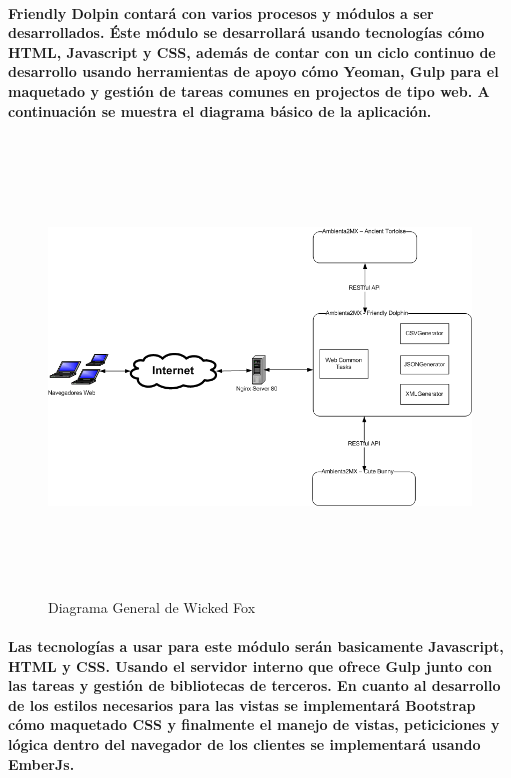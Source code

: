 	\paragraph{Friendly Dolpin contará con varios procesos y módulos a ser desarrollados. Éste módulo se desarrollará usando tecnologías cómo HTML, Javascript y CSS, además de contar con un ciclo continuo de desarrollo usando herramientas de apoyo cómo Yeoman, Gulp para el maquetado y gestión de tareas comunes en projectos de tipo web. A continuación se muestra el diagrama básico de la aplicación.}
  \newpage
  	\begin{landscape}
	  	\begin{figure}[h!]
	  	\centering
		  \includegraphics[width=22.5cm,height=12cm]{./images/DiagramaFriendlyDolphin.png}
		  \caption{Diagrama General de Wicked Fox}
		\end{figure}
  	\end{landscape}
  \newpage
  \paragraph{Las tecnologías a usar para este módulo serán basicamente Javascript, HTML y CSS. Usando el servidor interno que ofrece Gulp junto con las tareas y gestión de bibliotecas de terceros. En cuanto al desarrollo de los estilos necesarios para las vistas se implementará Bootstrap cómo maquetado CSS y finalmente el manejo de vistas, peticiciones y lógica dentro del navegador de los clientes se implementará usando EmberJs.}
